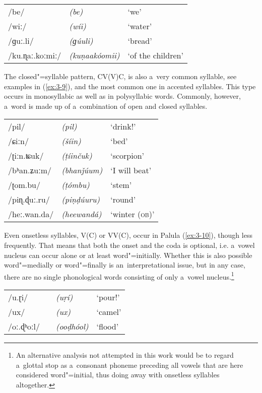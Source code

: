 \begin{exe}
\extab
\label{ex:3-8}
\begin{tabular}{ l l l }
/be/ &
\textit{(be)} &
`we'\\
/wiː/ &
\textit{(wíi)} &
`water'\\
/ɡuː.li/ &
\textit{(ɡúuli)} &
`bread'\\
/ku.ɳaː.koːmiː/ &
\textit{(kuṇaakóomii)} &
`of the children'\\
\end{tabular}
\end{exe}



The closed"=syllable pattern, CV(V)C, is also a~very common syllable, see examples in (\ref{ex:3-9}), and the most common one in accented syllables. This type occurs in monosyllabic as well as in polysyllabic words. Commonly, however, a~word is made up of a~combination of open and closed syllables. 


\begin{exe}
\extab
\label{ex:3-9}
\begin{tabular}{ l l l }
/pil/ &
\textit{(pil)} &
`drink!' \\
/ɕiːn/ &
\textit{(\v{s}íin)} &
`bed'\\
/ʈiːn.ʨuk/ &
\textit{(ṭíinčuk)} &
`scorpion'\\
/bʰan.ʑuːm/ &
\textit{(bhanǰúum)} &
`I will beat'\\
/ʈom.bu/ &
\textit{(ṭómbu)} &
`stem'\\
/piɳ.ɖuː.ru/ &
\textit{(piṇḍúuru)} &
`round'\\
/heː.wan.da/ &
\textit{(heewandá)} &
`winter (\textsc{ob)}'\\
\end{tabular}
\end{exe}


Even onsetless syllables, V(C) or VV(C), occur in Palula (\ref{ex:3-10}), though less frequently. That means that both the onset and the coda is optional, i.e. a~vowel nucleus can occur alone or at least word"=initially. Whether this is also possible word"=medially or word"=finally is an~interpretational issue, but in any case, there are no single phonological words consisting of only a~vowel nucleus.\footnote{An alternative analysis not attempted in this work would be to regard a~glottal stop as a~consonant phoneme preceding all vowels that are here considered word"=initial, thus doing away with onsetless syllables altogether.}


\begin{exe}
\extab
\label{ex:3-10}
\begin{tabular}{ l l l }
/u.ɽi/ &
\textit{(uṛí)} &
`pour!' \\
/ux/ &
\textit{(ux)} &
`camel'\\
/oː.ɖʰoːl/\ \ &
\textit{(ooḍhóol)} &
`flood'\\
\end{tabular}
\end{exe}


